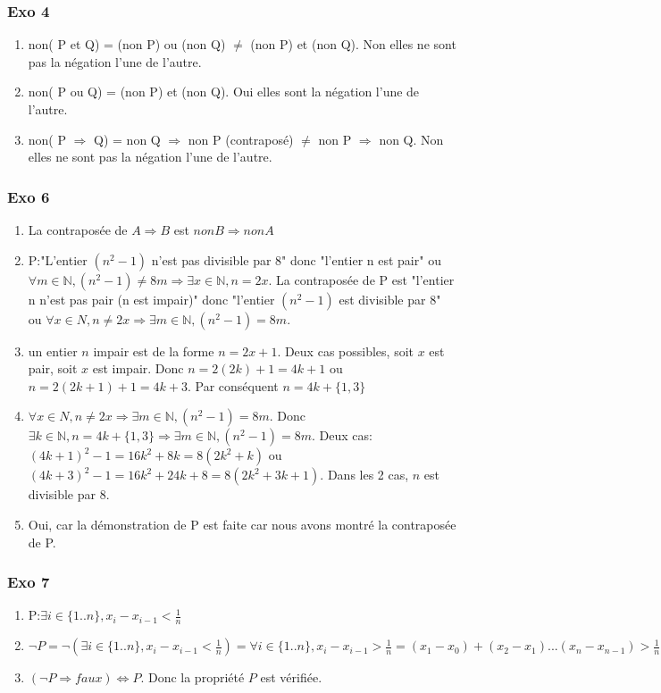 \documentclass[]{book}
\theoremstyle{definition}
\newcommand{\bb}[1]{\mathbb{#1}}
\newcommand{\N}{\bb{N}}
\begin{document}
\subsubsection*{Exo 4}
\begin{enumerate}
\item non( P et Q) = (non P) ou (non Q) $\neq$ (non P) et (non Q). Non elles ne sont pas la n\'egation l'une de l'autre.
\item non( P ou Q) = (non P) et (non Q). Oui elles sont la n\'egation l'une de l'autre.
\item non( P $\Rightarrow$ Q) = non Q $\Rightarrow$ non P (contrapos\'e) $\neq$ non P $\Rightarrow$ non Q. Non elles ne sont pas la n\'egation l'une de l'autre.
\end{enumerate}

\subsubsection*{Exo 6}
\begin{enumerate}
\item La contrapos\'ee de $A \Rightarrow B$ est $non B \Rightarrow non A$
\item P:"L'entier $(n^2 - 1)$ n'est pas divisible par 8" donc "l'entier n est pair" ou $\forall m \in \N, (n^2-1) \neq 8m \Rightarrow \exists x \in \N, n = 2x$. La contrapos\'ee de P est "l'entier n n'est pas pair (n est impair)" donc "l'entier $(n^2 - 1)$ est divisible par 8" ou $\forall x \in N, n \neq 2x \Rightarrow \exists m \in \N, (n^2-1) = 8m$.
\item un entier $n$ impair est de la forme $n = 2x+1$. Deux cas possibles, soit $x$ est pair, soit $x$ est impair. Donc $n=2(2k)+1=4k+1$ ou $n=2(2k+1)+1 = 4k+3$. Par cons\'equent $n = 4k +\{1,3\}$
\item $\forall x \in N, n \neq 2x \Rightarrow \exists m \in \N, (n^2-1) = 8m$. Donc $\exists k \in \N, n = 4k +\{1,3\} \Rightarrow \exists m \in \N, (n^2-1) = 8m$. Deux cas: $(4k+1)^2 -1 = 16k^2 + 8k = 8(2k^2+k)$ ou $(4k+3)^2 -1 = 16k^2+24k+8 = 8(2k^2+3k+1)$. Dans les 2 cas, $n$ est divisible par 8.
\item Oui, car la d\'emonstration de P est faite car nous avons montr\'e la contrapos\'ee de P.
\end{enumerate}

\subsubsection*{Exo 7}
\begin{enumerate}
\item P:$\exists i \in \{1..n\}, x_i - x_{i-1} < \frac{1}{n}$
\item $\lnot P = \lnot(\exists i \in \{1..n\}, x_i - x_{i-1} < \frac{1}{n}) = \forall i \in \{1..n\}, x_i - x_{i-1} > \frac{1}{n} = (x_1 - x_0)+(x_2 - x_1)...(x_{n}-x_{n-1}) > \frac{1}{n} + \frac{1}{n}...+ \frac{1}{n} = x_n - x_0 > 1 \Rightarrow faux$
\item  $(\lnot P \Rightarrow faux) \Leftrightarrow P$. Donc la propri\'et\'e $P$ est v\'erifi\'ee.
\end{enumerate}
\end{document}
